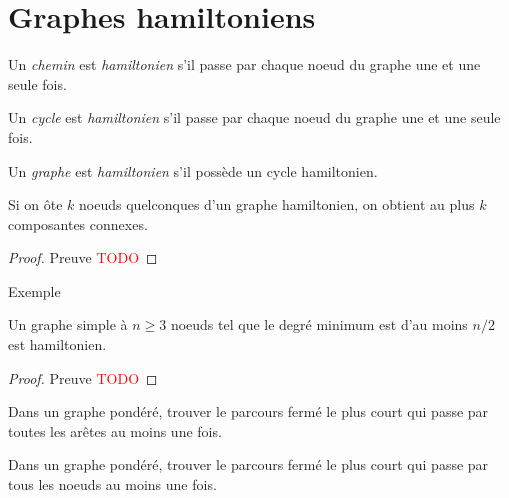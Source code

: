 \section{Graphes hamiltoniens}
\begin{mydef}
  Un \emph{chemin} est \emph{hamiltonien} s’il passe par chaque noeud du graphe une et une seule fois.
\end{mydef}

\begin{mydef}
  Un \emph{cycle} est \emph{hamiltonien} s’il passe par chaque noeud du graphe une et une seule fois.
\end{mydef}

\begin{mydef}
  Un \emph{graphe} est \emph{hamiltonien} s’il possède un cycle hamiltonien.
\end{mydef}

\begin{mytheo}  
  Si on ôte $k$ noeuds quelconques d’un graphe hamiltonien, on obtient au plus $k$ composantes connexes.
  \begin{proof}
     Preuve  \textcolor{red}{TODO}
  \end{proof}
\end{mytheo}
\begin{myexem}
  Exemple
\end{myexem}

\begin{mytheo}  
  Un graphe simple à $n \geq 3$ noeuds tel que le degré minimum est d’au moins $n/2$ est hamiltonien.
  \begin{proof}
     Preuve  \textcolor{red}{TODO}
  \end{proof}
\end{mytheo}

\begin{mydef} 
  Dans un graphe pondéré, trouver le parcours fermé le plus court qui passe par toutes les arêtes au moins une fois.
\end{mydef}

\begin{mydef} 
  Dans un graphe pondéré, trouver le parcours fermé le plus court qui passe par tous les noeuds au moins une fois.
\end{mydef}